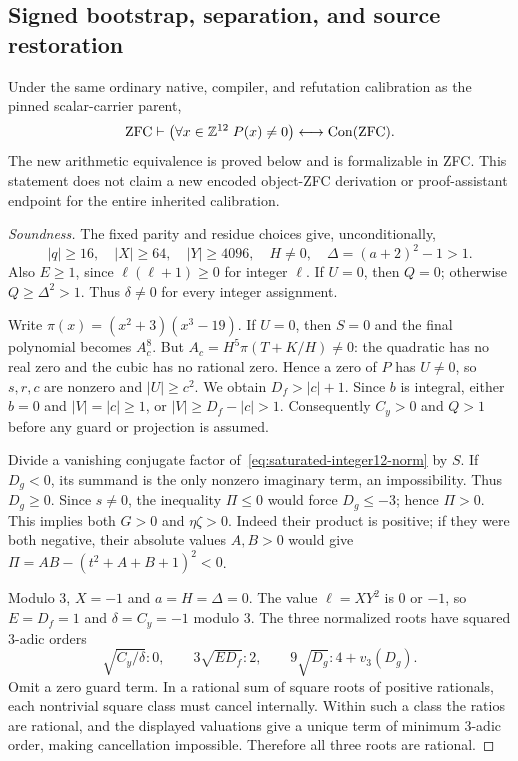 \subsection{Signed bootstrap, separation, and source restoration}

\begin{theorem}
Under the same ordinary native, compiler, and refutation calibration as the
pinned scalar-carrier parent,
\[
 \mathrm{ZFC}\vdash\left(
   \forall x\in\mathbb Z^{12}\;P(x)\ne0
 \right)\longleftrightarrow\operatorname{Con}(\mathrm{ZFC}).
\]
The new arithmetic equivalence is proved below and is formalizable in
ZFC.  This statement does not claim a new encoded object-ZFC derivation
or proof-assistant endpoint for the entire inherited calibration.
\end{theorem}

\begin{proof}[Soundness]
The fixed parity and residue choices give, unconditionally,
\[
 |q|\ge16,\quad |X|\ge64,\quad |Y|\ge4096,\quad
 H\ne0,\quad\Delta=(a+2)^2-1>1.
\]
Also $E\ge1$, since $\ell(\ell+1)\ge0$ for integer $\ell$.
If $U=0$, then $Q=0$; otherwise $Q\ge\Delta^2>1$.  Thus $\delta\ne0$
for every integer assignment.

Write $\pi(x)=(x^2+3)(x^3-19)$.  If $U=0$, then $S=0$ and
the final polynomial becomes $A_c^8$.  But
$A_c=H^5\pi(T+K/H)\ne0$: the quadratic has no real zero and the cubic
has no rational zero.  Hence a zero of $P$ has $U\ne0$, so $s,r,c$
are nonzero and $|U|\ge c^2$.  We obtain
$D_f>|c|+1$.  Since $b$ is integral, either $b=0$ and $|V|=|c|\ge1$,
or $|V|\ge D_f-|c|>1$.  Consequently $C_y>0$ and $Q>1$ before any
guard or projection is assumed.

Divide a vanishing conjugate factor of~\eqref{eq:saturated-integer12-norm}
by $S$.  If $D_g<0$, its summand is the only nonzero imaginary term,
an impossibility.  Thus $D_g\ge0$.  Since $s\ne0$, the inequality
$\Pi\le0$ would force $D_g\le-3$; hence $\Pi>0$.  This implies both
$G>0$ and $\eta\zeta>0$.  Indeed their product is positive; if they
were both negative, their absolute values $A,B>0$ would give
$\Pi=AB-(t^2+A+B+1)^2<0$.

Modulo 3, $X=-1$ and $a=H=\Delta=0$.  The value $\ell=XY^2$ is
0 or $-1$, so $E=D_f=1$ and $\delta=C_y=-1$ modulo 3.  The three
normalized roots have squared 3-adic orders
\[
 \sqrt{C_y/\delta}:0,\qquad
 3\sqrt{ED_f}:2,\qquad
 9\sqrt{D_g}:4+v_3(D_g).
\]
Omit a zero guard term.  In a rational sum of square roots of positive
rationals, each nontrivial square class must cancel internally.  Within
such a class the ratios are rational, and the displayed valuations
give a unique term of minimum 3-adic order, making cancellation
impossible.  Therefore all three roots are rational.


\end{proof}
